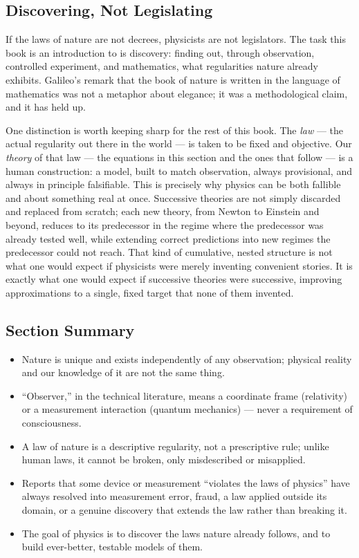 \subsection{Discovering, Not Legislating}

If the laws of nature are not decrees, physicists are not legislators. The
task this book is an introduction to is discovery: finding out, through
observation, controlled experiment, and mathematics, what regularities
nature already exhibits. Galileo's remark that the book of nature is
written in the language of mathematics was not a metaphor about elegance;
it was a methodological claim, and it has held up.

One distinction is worth keeping sharp for the rest of this book. The
\emph{law} --- the actual regularity out there in the world --- is taken
to be fixed and objective. Our \emph{theory} of that law --- the equations
in this section and the ones that follow --- is a human construction: a
model, built to match observation, always provisional, and always in
principle falsifiable. This is precisely why physics can be both fallible
and about something real at once. Successive theories are not simply
discarded and replaced from scratch; each new theory, from Newton to
Einstein and beyond, reduces to its predecessor in the regime where the
predecessor was already tested well, while extending correct predictions
into new regimes the predecessor could not reach. That kind of cumulative,
nested structure is not what one would expect if physicists were merely
inventing convenient stories. It is exactly what one would expect if
successive theories were successive, improving approximations to a single,
fixed target that none of them invented.

\subsection{ Section Summary}

\begin{itemize}
  \item Nature is unique and exists independently of any observation;
  physical reality and our knowledge of it are not the same thing.
  \item ``Observer,'' in the technical literature, means a coordinate frame
  (relativity) or a measurement interaction (quantum mechanics) --- never
  a requirement of consciousness.
  \item A law of nature is a descriptive regularity, not a prescriptive
  rule; unlike human laws, it cannot be broken, only misdescribed or
  misapplied.
  \item Reports that some device or measurement ``violates the laws of
  physics'' have always resolved into measurement error, fraud, a law
  applied outside its domain, or a genuine discovery that extends the law
  rather than breaking it.
  \item The goal of physics is to discover the laws nature already
  follows, and to build ever-better, testable models of them.
\end{itemize}

